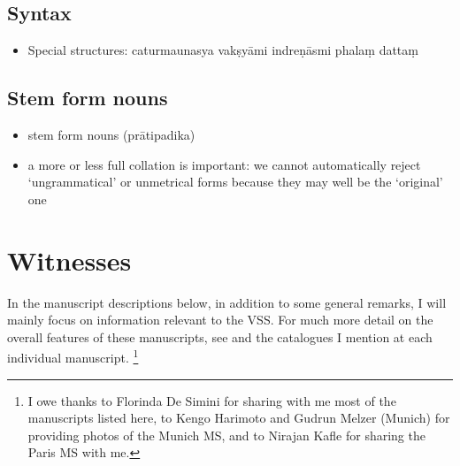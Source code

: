 \documentclass[11pt]{book}
\begin{document}
\subsection{Syntax}

\begin{itemize}

\item
  Special structures: caturmaunasya vakṣyāmi indreṇāsmi phalaṃ dattaṃ
\end{itemize}


\subsection{Stem form nouns}

\begin{itemize}
\item
  stem form nouns (prātipadika)
\item
  a more or less full collation is important: we cannot automatically
  reject `ungrammatical' or unmetrical forms because they may well be
  the `original' one
\end{itemize}




\vfill
\pagebreak




\section{Witnesses}
\frenchspacing

\noindent
In the manuscript descriptions below, in addition to some general
remarks, I will mainly focus on information relevant to the VSS. For
much more detail on the overall features of these manuscripts, see 
 and the catalogues I mention
at each individual manuscript.%
		\footnote{I owe thanks to Florinda De Simini for 
			sharing with me most of the manuscripts listed here, to
  			Kengo Harimoto and Gudrun Melzer (Munich) for 
  			providing photos of the  Munich MS, and to 
  			Nirajan Kafle for sharing the Paris MS with me.}
\end{document}

